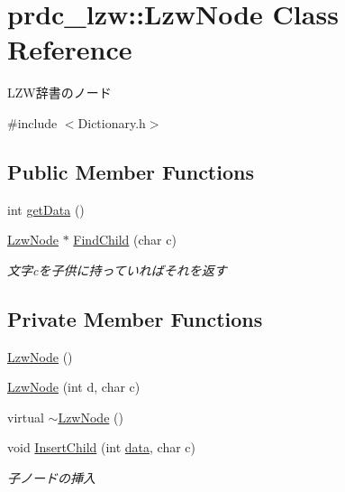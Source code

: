 \hypertarget{classprdc__lzw_1_1LzwNode}{\section{prdc\-\_\-lzw\-:\-:Lzw\-Node Class Reference}
\label{classprdc__lzw_1_1LzwNode}
}


L\-Z\-W辞書のノード  




{\ttfamily \#include $<$Dictionary.\-h$>$}

\subsection*{Public Member Functions}
\begin{DoxyCompactItemize}
\item 
int \hyperlink{classprdc__lzw_1_1LzwNode_ab9beb4b1fd0020fd63d05bb73efa0ba9}{get\-Data} ()
\item 
\hyperlink{classprdc__lzw_1_1LzwNode}{Lzw\-Node} $\ast$ \hyperlink{classprdc__lzw_1_1LzwNode_a4dbccb5fb97eae6f622a66a53eda46a3}{Find\-Child} (char c)
\begin{DoxyCompactList}\small\item\em 文字cを子供に持っていればそれを返す \end{DoxyCompactList}\end{DoxyCompactItemize}
\subsection*{Private Member Functions}
\begin{DoxyCompactItemize}
\item 
\hyperlink{classprdc__lzw_1_1LzwNode_aecd8429cfcb52da0c5a88c2eb2ce8f17}{Lzw\-Node} ()
\item 
\hyperlink{classprdc__lzw_1_1LzwNode_ab376216cc0c3c4893de9cc82e193bc0a}{Lzw\-Node} (int d, char c)
\item 
virtual \hyperlink{classprdc__lzw_1_1LzwNode_ab7c9e93839328025287d465734dfba4a}{$\sim$\-Lzw\-Node} ()
\item 
void \hyperlink{classprdc__lzw_1_1LzwNode_adcb9f453effcb8fac95bb08a59665eb7}{Insert\-Child} (int \hyperlink{classprdc__lzw_1_1LzwNode_ac85178681ea1181b22c3ac43af32515a}{data}, char c)
\begin{DoxyCompactList}\small\item\em 子ノードの挿入 \end{DoxyCompactList}\end{DoxyCompactItemize}
